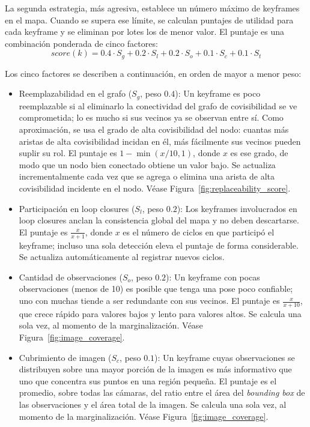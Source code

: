 La segunda estrategia, más agresiva, establece un número máximo de keyframes en el mapa. Cuando se supera ese límite, se calculan puntajes de utilidad para cada keyframe y se eliminan por lotes los de menor valor. El puntaje es una combinación ponderada de cinco factores:
$$ score(k) = 0.4 \cdot S_g + 0.2 \cdot S_l + 0.2 \cdot S_o + 0.1 \cdot S_c + 0.1 \cdot S_t $$

Los cinco factores se describen a continuación, en orden de mayor a menor peso:
\begin{itemize}
    \item Reemplazabilidad en el grafo ($S_g$, peso $0.4$): Un keyframe es poco reemplazable si al eliminarlo la conectividad del grafo de covisibilidad se ve comprometida; lo es mucho si sus vecinos ya se observan entre sí. Como aproximación, se usa el grado de alta covisibilidad del nodo: cuantas más aristas de alta covisibilidad incidan en él, más fácilmente sus vecinos pueden suplir su rol. El puntaje es $1 - \min(x/10, 1)$, donde $x$ es ese grado, de modo que un nodo bien conectado obtiene un valor bajo. Se actualiza incrementalmente cada vez que se agrega o elimina una arista de alta covisibilidad incidente en el nodo. Véase Figura~\ref{fig:replaceability_score}.

    \item Participación en loop closures ($S_l$, peso $0.2$): Los keyframes involucrados en loop closures anclan la consistencia global del mapa y no deben descartarse. El puntaje es $\frac{x}{x+1}$, donde $x$ es el número de ciclos en que participó el keyframe; incluso una sola detección eleva el puntaje de forma considerable. Se actualiza automáticamente al registrar nuevos ciclos.

    \item Cantidad de observaciones ($S_o$, peso $0.2$): Un keyframe con pocas observaciones (menos de 10) es posible que tenga una pose poco confiable; uno con muchas tiende a ser redundante con sus vecinos. El puntaje es $\frac{x}{x+10}$, que crece rápido para valores bajos y lento para valores altos. Se calcula una sola vez, al momento de la marginalización. Véase Figura~\ref{fig:image_coverage}.

    \item Cubrimiento de imagen ($S_c$, peso $0.1$): Un keyframe cuyas observaciones se distribuyen sobre una mayor porción de la imagen es más informativo que uno que concentra sus puntos en una región pequeña. El puntaje es el promedio, sobre todas las cámaras, del ratio entre el área del \textit{bounding box} de las observaciones y el área total de la imagen. Se calcula una sola vez, al momento de la marginalización. Véase Figura~\ref{fig:image_coverage}.


\end{itemize}
